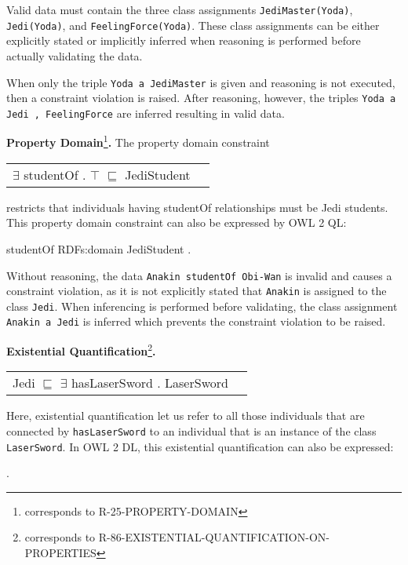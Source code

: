 \documentclass{llncs}
\newcommand{\ms}[1]{\texttt{#1}}
\newenvironment{DL}{
  \vspace{0cm}
  \begin{tabular}{r l}

}{
  \end{tabular}
}
\begin{document}
Valid data must contain the three class assignments \ms{JediMaster(Yoda)}, \ms{Jedi(Yoda)}, and \ms{FeelingForce(Yoda)}.
These class assignments can be either explicitly stated or implicitly inferred when reasoning is performed before actually validating the data.

When only the triple \ms{Yoda a JediMaster} is given and reasoning is not executed, then a constraint violation is raised.
After reasoning, however, the triples \ms{Yoda a Jedi , FeelingForce} are inferred resulting in valid data. 

\textbf{Property Domain}\footnote{corresponds to R-25-PROPERTY-DOMAIN}\textbf{.}
The property domain constraint

\begin{DL}
$\exists$ studentOf . $\top$ $\sqsubseteq$ JediStudent \\
\end{DL}

restricts that individuals having studentOf relationships must be Jedi students.
This property domain constraint can also be expressed by OWL 2 QL:

\begin{ex}
studentOf RDFs:domain JediStudent .
\end{ex}

Without reasoning, the data \ms{Anakin studentOf Obi-Wan} is invalid and causes a constraint violation, as it is not explicitly stated that \ms{Anakin} is assigned to the class \ms{Jedi}. 
When inferencing is performed before validating, the class assignment \ms{Anakin a Jedi} is inferred which prevents the constraint violation to be raised.

\textbf{Existential Quantification}\footnote{corresponds to R-86-EXISTENTIAL-QUANTIFICATION-ON-PROPERTIES}\textbf{.}

\begin{center}
\begin{DL}
Jedi $\sqsubseteq$ $\exists$ hasLaserSword . LaserSword
\end{DL}
\end{center}

Here, existential quantification let us refer to all those individuals that are connected by \ms{hasLaserSword} to an individual that is an instance of the class \ms{LaserSword}.
In OWL 2 DL, this existential quantification can also be expressed:

\begin{ex}
 .
\end{ex}
\end{document}
